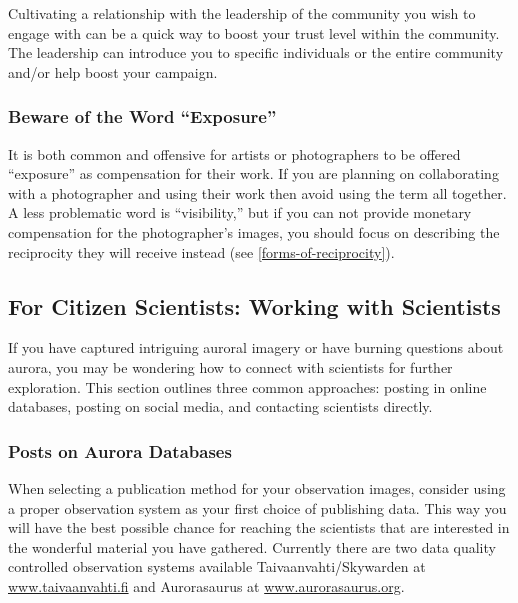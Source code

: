 \documentclass{article}
\newcommand{\contributed}[1]{%
    \par\noindent
    \begingroup
    \setlength{\leftskip}{1em}%
    \itshape
    Contributors: #1
    \par
    \endgroup
    \vspace{0.5em}
}
\begin{document}
Cultivating a relationship with the leadership of the community you wish to engage with can be a quick way to boost your trust level within the community. The leadership can introduce you to specific individuals or the entire community and/or help boost your campaign.

\subsubsection{Beware of the Word ``Exposure''}
It is both common and offensive for artists or photographers to be offered ``exposure'' as compensation for their work. If you are planning on collaborating with a photographer and using their work then avoid using the term all together. A less problematic word is ``visibility,'' but if you can not provide monetary compensation for the photographer's images, you should focus on describing the reciprocity they will receive instead (see \ref{forms-of-reciprocity}).

\subsection{For Citizen Scientists: Working with Scientists} 


If you have captured intriguing auroral imagery or have burning questions about aurora, you may be wondering how to connect with scientists for further exploration. This section outlines three common approaches: posting in online databases, posting on social media, and contacting scientists directly.

\subsubsection{Posts on Aurora Databases} 

When selecting a publication method for your observation images, consider using a proper observation system as your first choice of publishing data. This way you will have the best possible chance for reaching the scientists that are interested in the wonderful material you have gathered. Currently there are two data quality controlled observation systems available Taivaanvahti/Skywarden at \href{www.taivaanvahti.fi}{www.taivaanvahti.fi} and Aurorasaurus at \href{www.aurorasaurus.org}{www.aurorasaurus.org}.
\end{document}
